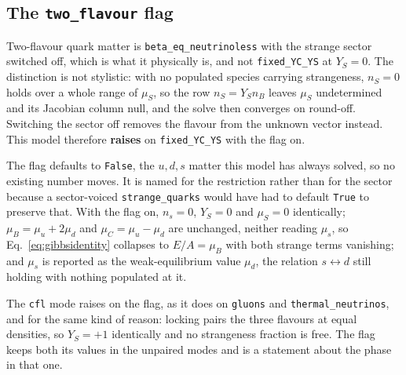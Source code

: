 \documentclass[aps,prc,onecolumn,superscriptaddress,nofootinbib,10pt]{revtex4-2}
\begin{document}
\subsection{The \texttt{two\_flavour} flag}

Two-flavour quark matter is \texttt{beta\_eq\_neutrinoless} with the strange
sector switched off, which is what it physically is, and not
\texttt{fixed\_YC\_YS} at $Y_S = 0$. The distinction is not stylistic: with no
populated species carrying strangeness, $n_S = 0$ holds over a whole range of
$\mu_S$, so the row $n_S = Y_S n_B$ leaves $\mu_S$ undetermined and its
Jacobian column null, and the solve then converges on round-off. Switching the
sector off removes the flavour from the unknown vector instead. This model
therefore \textbf{raises} on \texttt{fixed\_YC\_YS} with the flag on.

The flag defaults to \texttt{False}, the $u,d,s$ matter this model has always
solved, so no existing number moves. It is named for the restriction rather
than for the sector because a sector-voiced \texttt{strange\_quarks} would have
had to default \texttt{True} to preserve that. With the flag on, $n_s = 0$,
$Y_S = 0$ and $\mu_S = 0$ identically; $\mu_B = \mu_u + 2\mu_d$ and
$\mu_C = \mu_u - \mu_d$ are unchanged, neither reading $\mu_s$, so
Eq.~\eqref{eq:gibbsidentity} collapses to $E/A = \mu_B$ with both strange terms
vanishing; and $\mu_s$ is reported as the weak-equilibrium value $\mu_d$, the
relation $s \leftrightarrow d$ still holding with nothing populated at it.

The \texttt{cfl} mode raises on the flag, as it does on \texttt{gluons} and
\texttt{thermal\_neutrinos}, and for the same kind of reason: locking pairs the
three flavours at equal densities, so $Y_S = +1$ identically and no strangeness
fraction is free. The flag keeps both its values in the unpaired modes and is a
statement about the phase in that one.



\end{document}
